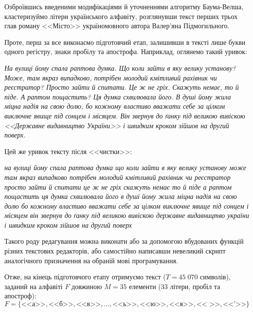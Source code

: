 Озброївшись введеними модифікаціями й уточненнями алгоритму Баума-Велша, кластеризуймо літери українського алфавіту, розглянувши текст перших трьох глав роману <<Місто>> україномовного автора Валер'яна Підмогильного. 

Проте, перш за все виконаємо підготовчий етап, залишивши в тексті лише букви одного регістру, знаки пробілу та апострофа. Наприклад, оглянемо такий уривок:

\vspace{0.3cm}
\begin{mdframed}[style=text box]
    \hspace{\tabsize}\textsl{
    На вулиці йому спала раптова думка. Що коли зайти в яку велику установу? Може, там якраз випадково, потрібен молодий кмітливий рахівник чи реєстратор? Просто зайти й спитати. Це ж не гріх. Скажуть немає, то й піде. А раптом пощастить? Ця думка схвилювала його. В душі йому жила міцна надія на свою долю, бо кожному властиво вважати себе за цілком виключне явище під сонцем і місяцем. Він звернув до ґанку під великою вивіскою <<Державне видавництво України>> і швидким кроком зійшов на другий поверх.}
\end{mdframed}

\vspace{0.3cm}
Цей же уривок тексту після <<чистки>>:

\vspace{0.3cm}
\begin{mdframed}[style=text box]
    \hspace{\tabsize}\textsl{
    на вулиці йому спала раптова думка що коли зайти в яку велику установу може там якраз випадково потрібен молодий кмітливий рахівник чи реєстратор просто зайти й спитати це ж не гріх скажуть немає то й піде а раптом пощастить ця думка схвилювала його в душі йому жила міцна надія на свою долю бо кожному властиво вважати себе за цілком виключне явище під сонцем і місяцем він звернув до ґанку під великою вивіскою державне видавництво україни і швидким кроком зійшов на другий поверх}
\end{mdframed}

\vspace{0.3cm}
Такого роду редагування можна виконати або за допомогою вбудованих функцій різних текстових редакторів, або самостійно написавши невеликий скрипт аналогічного призначення на обраній мові програмування. 

Отже, на кінець підготовчого етапу отримуємо текст ($T=45\; 070$ символів), заданий на алфавіті $F$ довжиною $M=35$ елементи ($33$ літери, пробіл та апостроф):
\begin{equation}
    F=\{\text{<<а>>},\text{<<б>>},\text{<<в>>},\ldots,\text{<<ь>>},\text{<<ю>>},\text{<<я>>},\text{<< >>},\text{<<'>>}\}
    \label{formula: UKR alphabet}
\end{equation}

